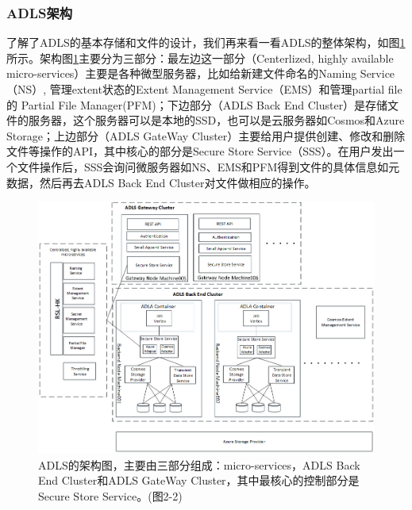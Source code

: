 \subsubsection{ADLS架构}
了解了ADLS的基本存储和文件的设计，我们再来看一看ADLS的整体架构，如图\ref{fig:ADLS-arc}所示。架构图\ref{fig:ADLS-arc}主要分为三部分：最左边这一部分（Centerlized, highly available micro-services）主要是各种微型服务器，比如给新建文件命名的Naming Service（NS）, 管理extent状态的Extent Management Service（EMS）和管理partial file的 Partial File Manager(PFM)；下边部分（ADLS Back End Cluster）是存储文件的服务器，这个服务器可以是本地的SSD，也可以是云服务器如Cosmos和Azure Storage；上边部分（ADLS GateWay Cluster）主要给用户提供创建、修改和删除文件等操作的API，其中核心的部分是Secure Store Service（SSS）。在用户发出一个文件操作后，SSS会询问微服务器如NS、EMS和PFM得到文件的具体信息如元数据，然后再去ADLS Back End Cluster对文件做相应的操作。
\begin{figure}[!htbp]
	\centering
	\includegraphics[width=0.78\linewidth]{figs/ADLS-arc.png}
	\caption{ADLS的架构图，主要由三部分组成：micro-services，ADLS Back End Cluster和ADLS GateWay Cluster，其中最核心的控制部分是Secure Store Service。(\cite{ramakrishnan2017azure}图2-2)}
	\label{fig:ADLS-arc}
\end{figure}

